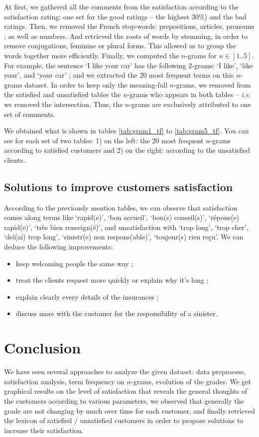 \documentclass[a4paper, 11pt]{article}
\begin{document}
        At first, we gathered all the comments from the satisfaction according to the satisfaction rating: one set for the good ratings -- the highest 30\%) and the bad ratings.
        Then, we removed the French stop-words: prepositions, articles, pronouns ; as well as numbers. And retrieved the roots of words by stemming, in order to remove conjugations, feminine or plural forms. This allowed us to group the words together more efficiently.
        Finally, we computed the $n$-grams for $n \in [1..5]$. For example, the sentence `I like your car' has the following 2-grams: `I like', `like your', and `your car' ;
        and we extracted the 20 most frequent terms on this $n$-grams dataset.
        In order to keep only the meaning-full $n$-grams, we removed from the satisfied and unsatisfied tables the $n$-grams who appears in both tables -- \textit{i.e.} we removed the intersection. Thus, the $n$-grams are exclusively attributed to one set of comments.

        We obtained what is shown in tables \ref{tab:gram1_tf} to \ref{tab:gram5_tf}. You can see for each set of two tables: 1) on the left: the 20 most frequent $n$-grams according to satisfied customers and 2) on the right: according to the unsatisfied clients.

    \subsection{Solutions to improve customers satisfaction}
        According to the previously mention tables, we can observe that satisfaction comes along terms like `rapid(e)', `bon accueil', `bon(s) conseil(s)', `répons(e) rapid(e)', `très bien renseign(é)', and unsatisfaction with `trop long', `trop cher', `del(ai) trop long', `sinistr(e) non respons(able)', `toujour(s) rien reçu'.
        We can deduce the following improvements:
        \begin{itemize}
            \item keep welcoming people the same way ;
            \item treat the clients request more quickly or explain why it's long ;
            \item explain clearly every details of the insurances ;
            \item discuss more with the customer for the responsibility of a sinister.
        \end{itemize}

     
\section{Conclusion}
\label{sec:ccl}
    We have seen several approaches to analyze the given dataset: data preprocess, satisfaction analysis, term frequency on $n$-grams, evolution of the grades. We get graphical results on the level of satisfaction that reveals the general thoughts of the customers according to various parameters, we observed that generally the grade are not changing by much over time for each customer, and finally retrieved the lexicon of satisfied / unsatisfied customers in order to propose solutions to increase their satisfaction. \\
\end{document}
